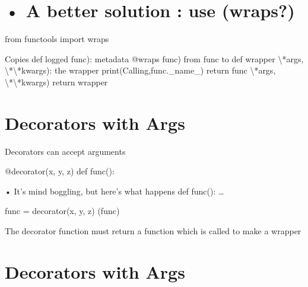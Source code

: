 \documentclass[
  letterpaper,
  DIV=11,
  numbers=noendperiod]{scrreprt}
\newenvironment{Shaded}{\begin{snugshade}}{\end{snugshade}}
\newcommand{\NormalTok}[1]{\textcolor[rgb]{0.00,0.23,0.31}{#1}}
\begin{document}

\chapter{\texorpdfstring{• A better solution : use
(\textbf{wraps?})}{• A better solution : use (wraps?)}}\label{a-better-solution-use-wraps}

from functools import wraps

\begin{Shaded}
\begin{Highlighting}[]
\NormalTok{Copies def logged func): metadata @wraps func) from func to def wrapper \textbackslash{}*args, \textbackslash{}*\textbackslash{}*kwargs): the wrapper print(\textquotesingle{}Calling\textquotesingle{},func.\_name\_) return func \textbackslash{}*args, \textbackslash{}*\textbackslash{}*kwargs) return wrapper }
\end{Highlighting}
\end{Shaded}


\chapter{Decorators with Args}\label{decorators-with-args}

Decorators can accept arguments

\begin{Shaded}
\begin{Highlighting}[]
\NormalTok{@decorator(x, y, z) def func():}
\end{Highlighting}
\end{Shaded}

• It's mind boggling, but here's what happens def func(): \ldots{}

\begin{Shaded}
\begin{Highlighting}[]
\NormalTok{func = decorator(x, y, z) (func) }
\end{Highlighting}
\end{Shaded}

The decorator function must return a function which is called to make a
wrapper


\chapter{Decorators with Args}\label{decorators-with-args-1}
\end{document}
